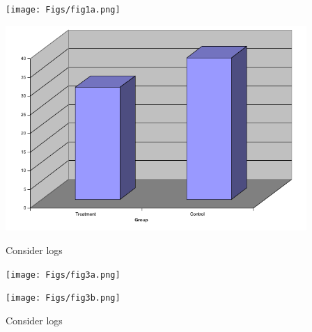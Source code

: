 \documentclass[12pt]{article}
\newcommand{\headsize}{\fontsize{35}{35} \selectfont}
\begin{document}
\begin{minipage}[t]{4.5in}
\vspace*{0cm}

\texttt{[image: Figs/fig1a.png]}
\end{minipage}
\hfill
\begin{minipage}[t]{4.5in}
\vspace*{0cm}

\includegraphics[width=4.5in]{Figs/fig1e.png}
\end{minipage}



\newpage


\headsize \color{yellow}
\hfill \begin{minipage}{5.75in}
\centering
Consider logs
\end{minipage}

\vspace{30mm}

\begin{minipage}[t]{4.5in}
\vspace*{0cm}

\texttt{[image: Figs/fig3a.png]}
\end{minipage}
\hfill
\begin{minipage}[t]{4.5in}
\vspace*{0cm}

\texttt{[image: Figs/fig3b.png]}
\end{minipage}


\newpage

\addtocounter{page}{-1}

\headsize \color{yellow}
\hfill \begin{minipage}{5.75in}
\centering
Consider logs
\end{minipage}

\vspace{30mm}
\end{document}
